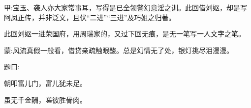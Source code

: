 

\begin{parag}
    \begin{note}甲:宝玉、袭人亦大家常事耳，写得是已全领警幻意淫之训。此回借刘妪，却是写阿凤正传，并非泛文，且伏“二进”“三进”及巧姐之归著。\end{note}
\end{parag}


\begin{parag}
    \begin{note}此回刘妪一进荣国府，用周瑞家的，又过下回无痕，是无一笔写一人文字之笔。\end{note}
\end{parag}


\begin{parag}
    \begin{note}蒙:风流真假一般看，借贷亲疏触眼酸。总是幻情无了处，银灯挑尽泪漫漫。\end{note}
\end{parag}


\begin{parag}
    题曰:
\end{parag}


\begin{poem}
    \begin{pl}朝叩富儿门，富儿犹未足。\end{pl}

    \begin{pl}虽无千金酬，嗟彼胜骨肉。\end{pl}
\end{poem}



